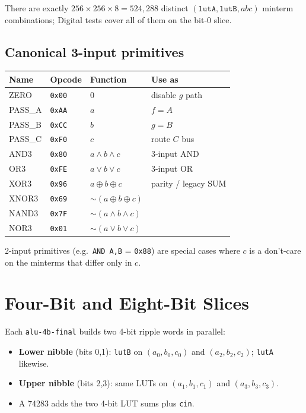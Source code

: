 \documentclass[10pt,a4paper]{article}
\begin{document}
There are exactly $256 \times 256 \times 8 = 524{,}288$ distinct $(\texttt{lutA},\texttt{lutB},abc)$ minterm combinations; Digital tests cover all of them on the bit-0 slice.

\subsection{Canonical 3-input primitives}

\begin{center}
\scriptsize
\begin{tabular}{@{}llll@{}}
\toprule
\textbf{Name} & \textbf{Opcode} & \textbf{Function} & \textbf{Use as} \\
\midrule
ZERO   & \texttt{0x00} & $0$ & disable $g$ path \\
PASS\_A & \texttt{0xAA} & $a$ & $f = A$ \\
PASS\_B & \texttt{0xCC} & $b$ & $g = B$ \\
PASS\_C & \texttt{0xF0} & $c$ & route $C$ bus \\
AND3   & \texttt{0x80} & $a \wedge b \wedge c$ & 3-input AND \\
OR3    & \texttt{0xFE} & $a \vee b \vee c$ & 3-input OR \\
XOR3   & \texttt{0x96} & $a \oplus b \oplus c$ & parity / legacy SUM \\
XNOR3  & \texttt{0x69} & $\sim(a \oplus b \oplus c)$ & \\
NAND3  & \texttt{0x7F} & $\sim(a \wedge b \wedge c)$ & \\
NOR3   & \texttt{0x01} & $\sim(a \vee b \vee c)$ & \\
\bottomrule
\end{tabular}
\end{center}

2-input primitives (e.g.\ \texttt{AND A,B} = \texttt{0x88}) are special cases where $c$ is a don't-care on the minterms that differ only in $c$.

\section{Four-Bit and Eight-Bit Slices}

Each \texttt{alu-4b-final} builds two 4-bit ripple words in parallel:
\begin{itemize}
  \item \textbf{Lower nibble} (bits 0,1): \texttt{lutB} on $(a_0,b_0,c_0)$ and $(a_2,b_2,c_2)$; \texttt{lutA} likewise.
  \item \textbf{Upper nibble} (bits 2,3): same LUTs on $(a_1,b_1,c_1)$ and $(a_3,b_3,c_3)$.
  \item A 74283 adds the two 4-bit LUT sums plus \texttt{cin}.
\end{itemize}
\end{document}
